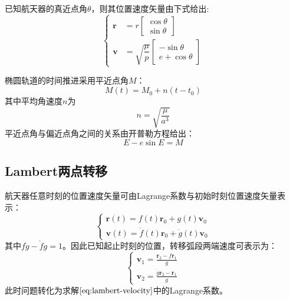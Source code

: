 \documentclass[10.5pt,twocolumn]{aaas}
\begin{document}
已知航天器的真近点角$\theta$，则其位置速度矢量由下式给出:
\begin{equation}
  \left\{
  \begin{aligned}
    \boldsymbol{r} & =
    r \begin{bmatrix}
        \cos \theta \\
        \sin \theta
      \end{bmatrix}
    \\
    \boldsymbol{v} & =
    \sqrt{\dfrac{\mu}{p}} \begin{bmatrix}
                            -\sin \theta \\
                            e+\cos \theta
                          \end{bmatrix}
  \end{aligned}
  \right.
\end{equation}

椭圆轨道的时间推进采用平近点角$M$：
\begin{equation}
  M(t)=M_0+n(t-t_0)
\end{equation}
其中平均角速度$n$为
\begin{equation}
  n=\sqrt{\frac{\mu}{a^3}}
\end{equation}
平近点角与偏近点角之间的关系由开普勒方程给出：
\begin{equation}
  E-e\sin E = M
\end{equation}


\subsection{Lambert两点转移}\label{subsec:lambert}

航天器任意时刻的位置速度矢量可由Lagrange系数与初始时刻位置速度矢量表示：
\begin{equation}
  \left\{
  \begin{aligned}
    \boldsymbol{r}(t)=f(t)\boldsymbol{r}_0+g(t)\boldsymbol{v}_0 \\
    \boldsymbol{v}(t)=\dot{f}(t)\boldsymbol{r}_0+\dot g(t)\boldsymbol{v}_0
  \end{aligned}
  \right.
\end{equation}
其中$f\dot{g}-\dot{f}g=1$。因此已知起止时刻的位置，转移弧段两端速度可表示为：
\begin{equation}\left\{
  \begin{aligned}
    \boldsymbol{v}_1=\frac{\boldsymbol{r}_2-f\boldsymbol{r}_1}{g} \\
    \boldsymbol{v}_2=\frac{\dot g\boldsymbol{r}_2-\boldsymbol{r}_1}{g}
  \end{aligned}
  \right.
  \label{eq:lambert-velocity}
\end{equation}
此时问题转化为求解$\eqref{eq:lambert-velocity}$中的Lagrange系数。
\end{document}
